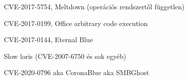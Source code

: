 \documentclass[12 pt]{beamer}
\begin{document}
\begin{frame}{CVE-2017-5754, Meltdown (operációs rendszertől független)}
\end{frame}

\begin{frame}{CVE-2017-0199, Office arbitrary code execution}
\end{frame}

\begin{frame}{CVE-2017-0144, Eternal Blue}
\end{frame}

\begin{frame}{Slow loris (CVE-2007-6750 és sok egyéb)}
\end{frame}

\begin{frame}{CVE-2020-0796 aka CoronaBlue aka SMBGhost}
\end{frame}
\end{document}
